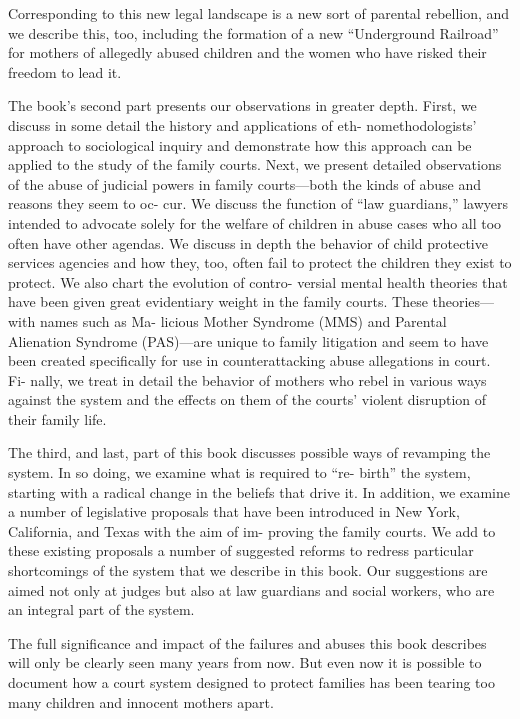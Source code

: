 Corresponding to this new legal landscape is a new sort of parental
rebellion, and we describe this, too, including the formation of a new
“Underground Railroad” for mothers of allegedly abused children and
the women who have risked their freedom to lead it. \pfl{}


The book’s second part presents our observations in greater depth.
First, we discuss in some detail the history and applications of eth-
nomethodologists’ approach to sociological inquiry and demonstrate
how this approach can be applied to the study of the family courts.
Next, we present detailed observations of the abuse of judicial powers
in family courts—both the kinds of abuse and reasons they seem to oc-
cur. We discuss the function of “law guardians,” lawyers intended to
advocate solely for the welfare of children in abuse cases who all too
often have other agendas. We discuss in depth the behavior of child
protective services agencies and how they, too, often fail to protect the
children they exist to protect. We also chart the evolution of contro-
versial mental health theories that have been given great evidentiary
weight in the family courts. These theories—with names such as Ma-
licious Mother Syndrome (MMS) and Parental Alienation Syndrome
(PAS)—are unique to family litigation and seem to have been created
specifically for use in counterattacking abuse allegations in court. Fi-
nally, we treat in detail the behavior of mothers who rebel in various
ways against the system and the effects on them of the courts’ violent
disruption of their family life. \pfl{}


The third, and last, part of this book discusses possible ways of
revamping the system. In so doing, we examine what is required to “re-
birth” the system, starting with a radical change in the beliefs that drive
it. In addition, we examine a number of legislative proposals that have
been introduced in New York, California, and Texas with the aim of im-
proving the family courts. We add to these existing proposals a number
of suggested reforms to redress particular shortcomings of the system
that we describe in this book. Our suggestions are aimed not only at
judges but also at law guardians and social workers, who are an integral
part of the system. \pfl{}



The full significance and impact of the failures and abuses this book
describes will only be clearly seen many years from now. But even now it
is possible to document how a court system designed to protect families
has been tearing too many children and innocent mothers apart.
